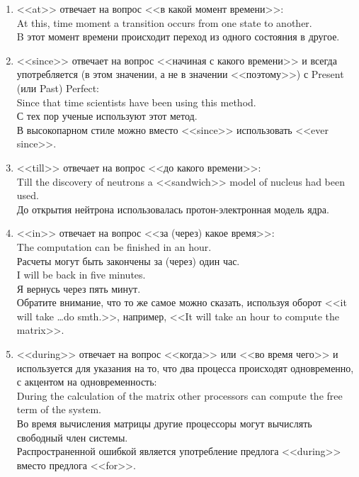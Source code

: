 \documentclass[a5paper, 10pt, twoside, numbers=enddot]{scrartcl}
\begin{document}
\begin{enumerate}
\begin{enumerate}
    \item <<at>> отвечает на вопрос <<в какой момент времени>>:\\ [4pt]
    \textsf{At this, time moment a transition occurs from one state to another.\\
    B этот момент времени происходит переход из одного состояния в другое.}
    
    \item <<since>> отвечает на вопрос <<начиная с какого времени>> и всегда употребляется (в этом значении, а не в значении <<поэтому>>) с Present (или Past) Perfect:\\ [4pt]
    \textsf{Since that time scientists have been using this method.\\
    С тех пор ученые используют этот метод.\\ [4pt]}
    В высокопарном стиле можно вместо <<since>> использовать <<ever since>>.
    
    \item <<till>> отвечает на вопрос <<до какого времени>>:\\ [4pt]
    \textsf{Till the discovery of neutrons a <<sandwich>> model of nucleus had been used.\\
    До открытия нейтрона использовалась протон-электронная модель ядра.}
    
    \item <<in>> отвечает на вопрос <<за (через) какое время>>:\\ [4pt]
    \textsf{The computation can be finished in an hour.\\
    Расчеты могут быть закончены за (через) один час.\\ [4pt]
    I will  be back in five minutes.\\
    Я вернусь через пять минут.\\ [4pt]}
    Обратите внимание, что то же самое можно сказать, используя оборот <<it will take \ldots do smth.>>, например, <<It will take an hour to compute the matrix>>.
    
    \item <<during>> отвечает на вопрос <<когда>> или <<во время чего>> и используется для указания на то, что два процесса происходят одновременно, с акцентом на одновременность:\\ [4pt]
    \textsf{During the calculation of the matrix other processors can compute the free term of the system.\\
    Во время вычисления матрицы другие  процессоры могут вычислять свободный член системы.\\ [4pt]}
    Распространенной ошибкой является употребление предлога <<during>> вместо предлога <<for>>.
    

\end{enumerate}
\end{enumerate}
\end{document}
